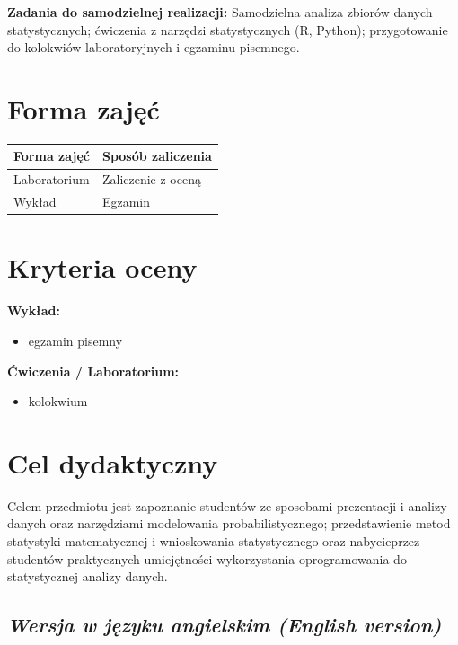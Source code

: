 \documentclass[12pt, a4paper]{article}
\newcommand{\thdrule}{\noalign{\global\setlength{\extrarowheight}{0pt}}}
\newcommand{\thdend}{\noalign{\global\setlength{\extrarowheight}{3pt}}}
\begin{document}
\vspace{4pt}
\noindent\textbf{Zadania do samodzielnej realizacji:} Samodzielna analiza zbiorów danych statystycznych; ćwiczenia z narzędzi statystycznych (R, Python); przygotowanie do kolokwiów laboratoryjnych i egzaminu pisemnego.

\section{Forma zajęć}

\begin{center}
{\scriptsize
\begin{tabular}{m{5cm}m{8cm}}
\thdrule\toprule
\rowcolor{pjatkRed} {\color{white}\textbf{Forma zajęć}} & {\color{white}\textbf{Sposób zaliczenia}} \\
\midrule\thdend
  \rowcolor{tableRowLight} Laboratorium & Zaliczenie z oceną \\
  \rowcolor{tableRowAlt} Wykład & Egzamin \\
\bottomrule
\end{tabular}}
\end{center}

\section{Kryteria oceny}

\textbf{Wykład:}
\begin{itemize}
  \item egzamin pisemny
\end{itemize}
\vspace{4pt}
\textbf{Ćwiczenia / Laboratorium:}
\begin{itemize}
  \item kolokwium
\end{itemize}


\section{Cel dydaktyczny}

Celem przedmiotu jest zapoznanie studentów ze sposobami prezentacji i analizy danych oraz narzędziami modelowania probabilistycznego; przedstawienie metod statystyki matematycznej i wnioskowania statystycznego oraz nabycieprzez studentów praktycznych umiejętności wykorzystania oprogramowania do statystycznej analizy danych.

\subsection*{\textit{Wersja w języku angielskim (English version)}}
\end{document}
